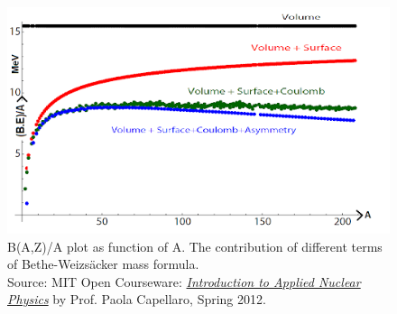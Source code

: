 \documentclass[ebook,12pt,oneside,openany]{memoir}
\begin{document}
\begin{enumerate}[label=\textbf{\Alph*.}]
        \begin{figure}
            \centering
            \includegraphics[width = \textwidth]{images/BE_A_plot.png}
            \caption{B(A,Z)/A plot as function of A. The contribution of different terms of Bethe-Weizsäcker mass formula.\\Source: MIT Open Courseware: \href{https://ocw.mit.edu/courses/nuclear-engineering/22-02-introduction-to-applied-nuclear-physics-spring-2012/}{\textit{Introduction to Applied Nuclear Physics}} by Prof. Paola Capellaro, Spring 2012.}
            
            \label{fig:plot_BE_A}
        \end{figure}
        
        
        
        
\end{enumerate}    
\end{document}
